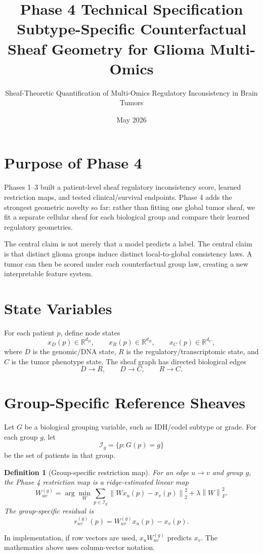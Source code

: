 \documentclass[11pt]{article}
\title{Phase 4 Technical Specification\\Subtype-Specific Counterfactual Sheaf Geometry for Glioma Multi-Omics}
\author{Sheaf-Theoretic Quantification of Multi-Omics Regulatory Inconsistency in Brain Tumors}
\date{May 2026}
\newtheorem{definition}{Definition}
\newcommand{\R}{\mathbb{R}}
\newcommand{\norm}[1]{\left\lVert #1 \right\rVert}
\begin{document}
\maketitle
\tableofcontents
\newpage

\section{Purpose of Phase 4}
Phases 1--3 built a patient-level sheaf regulatory inconsistency score, learned restriction maps, and tested clinical/survival endpoints. Phase 4 adds the strongest geometric novelty so far: rather than fitting one global tumor sheaf, we fit a separate cellular sheaf for each biological group and compare their learned regulatory geometries.

The central claim is not merely that a model predicts a label. The central claim is that distinct glioma groups induce distinct local-to-global consistency laws. A tumor can then be scored under each counterfactual group law, creating a new interpretable feature system.

\section{State Variables}
For each patient $p$, define node states
\[
  x_D(p)\in\R^{d_D},\qquad x_R(p)\in\R^{d_R},\qquad x_C(p)\in\R^{d_C},
\]
where $D$ is the genomic/DNA state, $R$ is the regulatory/transcriptomic state, and $C$ is the tumor phenotype state. The sheaf graph has directed biological edges
\[
  D\to R,\qquad D\to C,\qquad R\to C.
\]

\section{Group-Specific Reference Sheaves}
Let $G$ be a biological grouping variable, such as IDH/codel subtype or grade. For each group $g$, let
\[
  \mathcal{I}_g=\{p: G(p)=g\}
\]
be the set of patients in that group.

\begin{definition}[Group-specific restriction map]
For an edge $u\to v$ and group $g$, the Phase 4 restriction map is a ridge-estimated linear map
\[
  W_{uv}^{(g)}
  =\arg\min_W
  \sum_{p\in\mathcal{I}_g}
  \norm{W x_u(p)-x_v(p)}_2^2
  +\lambda\norm{W}_F^2.
\]
The group-specific residual is
\[
  r_{uv}^{(g)}(p)=W_{uv}^{(g)}x_u(p)-x_v(p).
\]
\end{definition}

In implementation, if row vectors are used, $x_uW_{uv}^{(g)}$ predicts $x_v$. The mathematics above uses column-vector notation.
\end{document}
